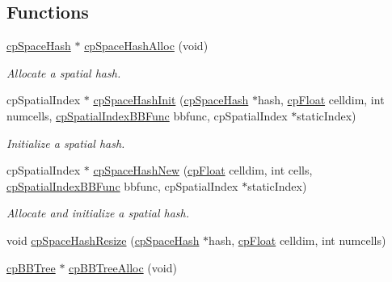 \subsection*{Functions}
\begin{DoxyCompactItemize}
\item 
\hypertarget{group__cp_spatial_index_ga61ba28bd31d8f7e19d331afae0ee76b9}{\hyperlink{structcp_space_hash}{cp\-Space\-Hash} $\ast$ \hyperlink{group__cp_spatial_index_ga61ba28bd31d8f7e19d331afae0ee76b9}{cp\-Space\-Hash\-Alloc} (void)}\label{group__cp_spatial_index_ga61ba28bd31d8f7e19d331afae0ee76b9}

\begin{DoxyCompactList}\small\item\em Allocate a spatial hash. \end{DoxyCompactList}\item 
\hypertarget{group__cp_spatial_index_gac028d5b83798b0a9bbd4d0d29b9f7914}{cp\-Spatial\-Index $\ast$ \hyperlink{group__cp_spatial_index_gac028d5b83798b0a9bbd4d0d29b9f7914}{cp\-Space\-Hash\-Init} (\hyperlink{structcp_space_hash}{cp\-Space\-Hash} $\ast$hash, \hyperlink{group__basic_types_gac1ed65573e035bf892505768c852d8d3}{cp\-Float} celldim, int numcells, \hyperlink{group__cp_spatial_index_gafbecd34bd436d4a56200b7a542d94fc1}{cp\-Spatial\-Index\-B\-B\-Func} bbfunc, cp\-Spatial\-Index $\ast$static\-Index)}\label{group__cp_spatial_index_gac028d5b83798b0a9bbd4d0d29b9f7914}

\begin{DoxyCompactList}\small\item\em Initialize a spatial hash. \end{DoxyCompactList}\item 
\hypertarget{group__cp_spatial_index_ga48c6a8a52184403547f5c185c2a758f6}{cp\-Spatial\-Index $\ast$ \hyperlink{group__cp_spatial_index_ga48c6a8a52184403547f5c185c2a758f6}{cp\-Space\-Hash\-New} (\hyperlink{group__basic_types_gac1ed65573e035bf892505768c852d8d3}{cp\-Float} celldim, int cells, \hyperlink{group__cp_spatial_index_gafbecd34bd436d4a56200b7a542d94fc1}{cp\-Spatial\-Index\-B\-B\-Func} bbfunc, cp\-Spatial\-Index $\ast$static\-Index)}\label{group__cp_spatial_index_ga48c6a8a52184403547f5c185c2a758f6}

\begin{DoxyCompactList}\small\item\em Allocate and initialize a spatial hash. \end{DoxyCompactList}\item 
void \hyperlink{group__cp_spatial_index_ga71489134c15a3bcb1efb0913e765a3c1}{cp\-Space\-Hash\-Resize} (\hyperlink{structcp_space_hash}{cp\-Space\-Hash} $\ast$hash, \hyperlink{group__basic_types_gac1ed65573e035bf892505768c852d8d3}{cp\-Float} celldim, int numcells)
\item 
\hypertarget{group__cp_spatial_index_ga415b605cbf6dc64a6f519923bb14e223}{\hyperlink{structcp_b_b_tree}{cp\-B\-B\-Tree} $\ast$ \hyperlink{group__cp_spatial_index_ga415b605cbf6dc64a6f519923bb14e223}{cp\-B\-B\-Tree\-Alloc} (void)}\label{group__cp_spatial_index_ga415b605cbf6dc64a6f519923bb14e223}


\end{DoxyCompactItemize}
